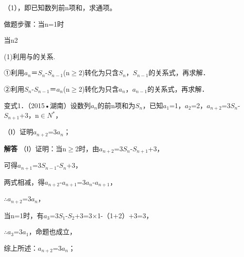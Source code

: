 \par\bigskip{}\par
（1）\qquad{}，即已知数列前n项和，求通项。\par
做题步骤：当n=1时\par
当n2\par
\qquad{}(1)利用与的关系.\par
\qquad{}①利用\ensuremath{a_{n}}＝\ensuremath{S_{n}}-\ensuremath{S_{n-1}}(n\ensuremath{\ge}2)转化为只含\ensuremath{S_{n}}，\ensuremath{S_{n-1}}的关系式，再求解．\par
\qquad{}②利用\ensuremath{S_{n}}-\ensuremath{S_{n-1}}＝\ensuremath{a_{n}}(n\ensuremath{\ge}2)转化为只含\ensuremath{a_{n}}，\ensuremath{a_{n-1}}的关系式，再求解．\par
变式1．（2015•湖南）设数列{\ensuremath{a_{n}}}的前n项和为\ensuremath{S_{n}}，已知\ensuremath{a_{1}}=1，\ensuremath{a_{2}}=2，\ensuremath{a_{n+2}}=3\ensuremath{S_{n}}-\ensuremath{S_{n+1}}+3，n\ensuremath{\in}\ensuremath{N^{*}}，\par
（Ⅰ）证明\ensuremath{a_{n+2}}=3\ensuremath{a_{n}}；\par
\ifshowanswers
\par\begingroup\color{solutioncolor}\noindent\textbf{解答}\quad
（Ⅰ）证明：当n\ensuremath{\ge}2时，由\ensuremath{a_{n+2}}=3\ensuremath{S_{n}}-\ensuremath{S_{n+1}}+3，\par
可得\ensuremath{a_{n+1}}=3\ensuremath{S_{n-1}}-\ensuremath{S_{n}}+3，\par
两式相减，得\ensuremath{a_{n+2}}-\ensuremath{a_{n+1}}=3\ensuremath{a_{n}}-\ensuremath{a_{n+1}}，\par
\ensuremath{\therefore}\ensuremath{a_{n+2}}=3\ensuremath{a_{n}}，\par
当n=1时，有\ensuremath{a_{3}}=3\ensuremath{S_{1}}-\ensuremath{S_{2}}+3=3\ensuremath{\times}1-（1+2）+3=3，\par
\ensuremath{\therefore}\ensuremath{a_{3}}=3\ensuremath{a_{1}}，命题也成立，\par
综上所述：\ensuremath{a_{n+2}}=3\ensuremath{a_{n}}；\par
\par\endgroup\fi

